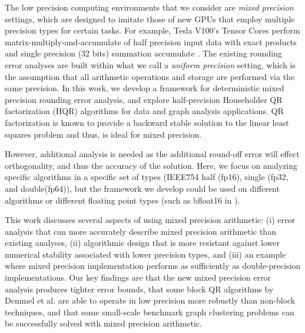 The low precision computing environments that we consider are \emph{mixed precision} settings, which are designed to imitate those of new GPUs that employ multiple precision types for certain tasks. 
For example, Tesla V100's Tensor Cores perform matrix-multiply-and-accumulate of half precision input data with exact products and single precision (32 bits) summation accumulate \cite{nvdia}.
The existing rounding error analyses are built within what we call a \emph{uniform precision} setting, which is the assumption that all arithmetic operations and storage are performed via the same precision.
In this work, we develop a framework for deterministic mixed precision rounding error analysis, and explore half-precision Householder QR factorization (HQR) algorithms for data and graph analysis applications. 
QR factorization is known to provide a backward stable solution to the linear least squares problem and thus, is ideal for mixed precision. 

However, additional analysis is needed as the additional round-off error will effect orthogonality, and thus the accuracy of the solution. 
Here, we focus on analyzing specific algorithms in a specific set of types (IEEE754 half (fp16), single (fp32, and double(fp64)), but the framework we develop 
could be used on different algorithms or different floating point types (such as bfloat16 in \cite{tagliavini2018floating}).\par

This work discusses several aspects of using mixed precision arithmetic: (i) error analysis that can more accurately describe mixed precision arithmetic than existing analyses, (ii) algorithmic design that is more resistant against lower numerical stability associated with lower precision types, and (iii) an example where mixed precision implementation performs as sufficiently as double-precision implementations. 
Our key findings are that the new mixed precision error analysis produces tighter error bounds, that some block QR algorithms by Demmel et al. \cite{Demmel2012} are able to operate in low precision more robustly than non-block techniques, and that some small-scale benchmark graph clustering problems can be successfully solved with mixed precision arithmetic.
